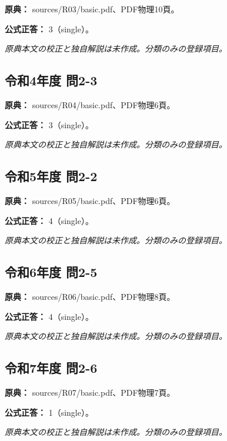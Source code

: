 \noindent\textbf{原典：} sources/R03/basic.pdf、PDF物理10頁。

\textbf{公式正答：} 3（single）。

\par\textit{原典本文の校正と独自解説は未作成。分類のみの登録項目。}

\subsection{令和4年度 問2-3}
\label{q:r04-reg-basic-2-3}

\noindent\textbf{原典：} sources/R04/basic.pdf、PDF物理6頁。

\textbf{公式正答：} 3（single）。

\par\textit{原典本文の校正と独自解説は未作成。分類のみの登録項目。}

\subsection{令和5年度 問2-2}
\label{q:r05-reg-basic-2-2}

\noindent\textbf{原典：} sources/R05/basic.pdf、PDF物理6頁。

\textbf{公式正答：} 4（single）。

\par\textit{原典本文の校正と独自解説は未作成。分類のみの登録項目。}

\subsection{令和6年度 問2-5}
\label{q:r06-reg-basic-2-5}

\noindent\textbf{原典：} sources/R06/basic.pdf、PDF物理8頁。

\textbf{公式正答：} 4（single）。

\par\textit{原典本文の校正と独自解説は未作成。分類のみの登録項目。}

\subsection{令和7年度 問2-6}
\label{q:r07-reg-basic-2-6}

\noindent\textbf{原典：} sources/R07/basic.pdf、PDF物理7頁。

\textbf{公式正答：} 1（single）。

\par\textit{原典本文の校正と独自解説は未作成。分類のみの登録項目。}

